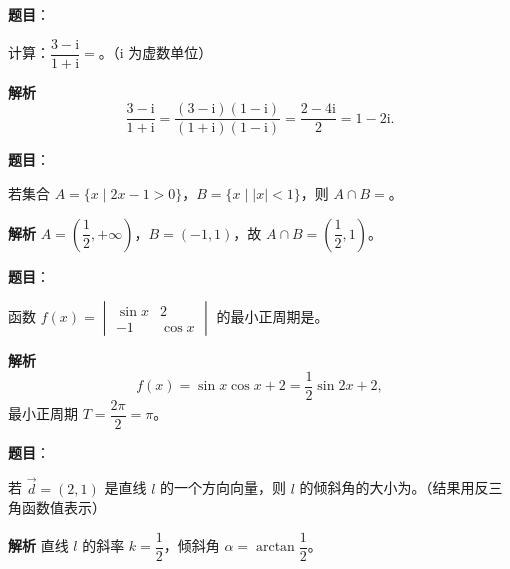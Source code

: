 
\begin{answer}

\textbf{题目}：

计算：$\dfrac{3-\mathrm i}{1+\mathrm i}=$\gkblank{}。（$\mathrm i$ 为虚数单位）

\textbf{解析}
\nopagebreak[4]
\[\frac{3-\mathrm i}{1+\mathrm i}=\frac{(3-\mathrm i)(1-\mathrm i)}{(1+\mathrm i)(1-\mathrm i)}=\frac{2-4\mathrm i}2=1-2\mathrm i.\]


\end{answer}
\begin{answer}

\textbf{题目}：

若集合 $A=\{x\mid2x-1>0\}$，$B=\{x\mid|x|<1\}$，则 $A\cap B=$\gkblank{}。

\textbf{解析}
$A=\left(\dfrac12,+\infty\right)$，$B=(-1,1)$，故 $A\cap B=\left(\dfrac12,1\right)$。


\end{answer}
\begin{answer}

\textbf{题目}：

函数 $f(x)=\begin{vmatrix}\sin x&2\\ -1&\cos x\end{vmatrix}$ 的最小正周期是\gkblank{}。

\textbf{解析}
\nopagebreak[4]
\[f(x)=\sin x\cos x+2=\frac12\sin2x+2,\]
最小正周期 $T=\dfrac{2\pi}2=\pi$。


\end{answer}
\begin{answer}

\textbf{题目}：

若 $\overrightarrow d=(2,1)$ 是直线 $l$ 的一个方向向量，则 $l$ 的倾斜角的大小为\gkblank{}。（结果用反三角函数值表示）

\textbf{解析}
直线 $l$ 的斜率 $k=\dfrac12$，倾斜角 $\alpha=\arctan\dfrac12$。


\end{answer}
